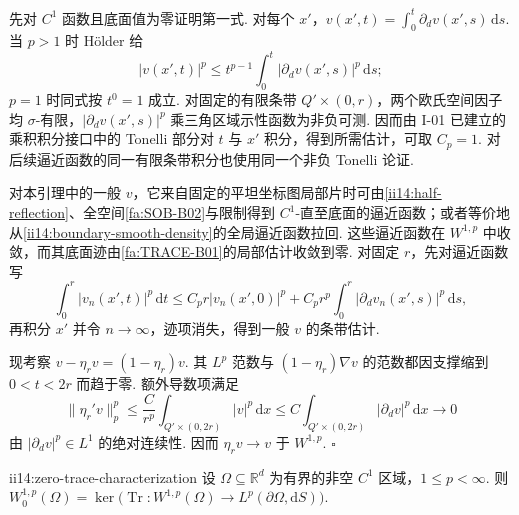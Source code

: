 \begin{FAProof}
先对 \(\displaystyle C^1\) 函数且底面值为零证明第一式. 对每个 \(\displaystyle x'\)，\(\displaystyle v(x',t)=\int_0^t\partial_dv(x',s)\,\mathrm{d}s\). 当 \(\displaystyle p>1\) 时 Hölder 给
\[
|v(x',t)|^p
\leqslant
t^{p-1}\int_0^t|\partial_dv(x',s)|^p\,\mathrm{d}s;
\]
\(\displaystyle p=1\) 时同式按 \(\displaystyle t^0=1\) 成立. 对固定的有限条带 \(\displaystyle Q'\times(0,r)\)，两个欧氏空间因子均 \(\displaystyle\sigma\)-有限，\(\displaystyle|\partial_dv(x',s)|^p\) 乘三角区域示性函数为非负可测. 因而由 I-01 已建立的乘积积分接口中的 Tonelli 部分对 \(\displaystyle t\) 与 \(\displaystyle x'\) 积分，得到所需估计，可取 \(\displaystyle C_p=1\). 对后续逼近函数的同一有限条带积分也使用同一个非负 Tonelli 论证.

对本引理中的一般 \(\displaystyle v\)，它来自固定的平坦坐标图局部片时可由\autoref{ii14:half-reflection}、全空间\autoref{fa:SOB-B02}与限制得到 \(\displaystyle C^1\)-直至底面的逼近函数；或者等价地从\autoref{ii14:boundary-smooth-density}的全局逼近函数拉回. 这些逼近函数在 \(\displaystyle W^{1,p}\) 中收敛，而其底面迹由\autoref{fa:TRACE-B01}的局部估计收敛到零. 对固定 \(\displaystyle r\)，先对逼近函数写
\[
\int_0^r|v_n(x',t)|^p\,\mathrm{d}t
\leqslant
C_pr|v_n(x',0)|^p
+
C_pr^p\int_0^r|\partial_dv_n(x',s)|^p\,\mathrm{d}s,
\]
再积分 \(\displaystyle x'\) 并令 \(\displaystyle n\to\infty\)，迹项消失，得到一般 \(\displaystyle v\) 的条带估计.

现考察 \(\displaystyle v-\eta_rv=(1-\eta_r)v\). 其 \(\displaystyle L^p\) 范数与 \(\displaystyle(1-\eta_r)\nabla v\) 的范数都因支撑缩到 \(\displaystyle0<t<2r\) 而趋于零. 额外导数项满足
\[
\|\eta_r'v\|_p^p
\leqslant
\frac{C}{r^p}
\int_{Q'\times(0,2r)}|v|^p\,\mathrm{d}x
\leqslant
C
\int_{Q'\times(0,2r)}|\partial_dv|^p\,\mathrm{d}x
\longrightarrow0
\]
由 \(\displaystyle|\partial_dv|^p\in L^1\) 的绝对连续性. 因而 \(\displaystyle\eta_rv\to v\) 于 \(\displaystyle W^{1,p}\).
\hfill\(\square\)
\end{FAProof}

\begin{FATheorem}[B][零迹刻画]{ii14:zero-trace-characterization}
设 \(\displaystyle\Omega\subseteq\mathbb R^d\) 为有界的非空 \(\displaystyle C^1\) 区域，\(\displaystyle1\leqslant p<\infty\). 则 \(\displaystyle W_0^{1,p}(\Omega)=\ker\bigl(\operatorname{Tr}:W^{1,p}(\Omega)\to L^p(\partial\Omega,\mathrm{d}S)\bigr)\).
\end{FATheorem}

